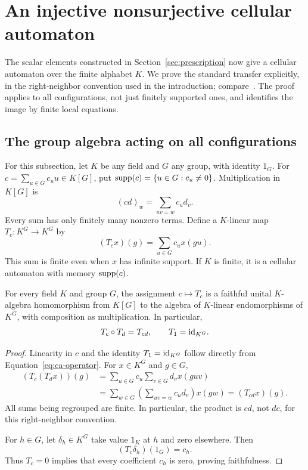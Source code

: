 \section{An injective nonsurjective cellular automaton}
\label{sec:cellular}

The scalar elements constructed in Section~\ref{sec:prescription} now
give a cellular automaton over the finite alphabet $K$. We prove the
standard transfer explicitly, in the right-neighbor convention used
in the introduction; compare\ \cite[Section~1]{ElekSzabo2004}.
The proof applies to all configurations, not just finitely supported
ones, and identifies the image by finite local equations.

\subsection{The group algebra acting on all configurations}

For this subsection, let $K$ be any field and $G$ any group, with
identity $1_G$. For $c=\sum_{u\in G}c_u u\in K[G]$, put
$\operatorname{supp}(c)=\{u\in G:c_u\ne0\}$. Multiplication in $K[G]$ is
\[
  (cd)_w=\sum_{uv=w}c_ud_v.
\]
Every sum has only finitely many nonzero terms. Define a $K$-linear map
$T_c:K^G\to K^G$ by
\begin{equation}
\label{eq:ca-operator}
  (T_cx)(g)=\sum_{u\in G}c_u x(gu).
\end{equation}
This sum is finite even when $x$ has infinite support. If $K$ is
finite, it is a cellular automaton with memory $\operatorname{supp}(c)$.

\begin{lemma}
\label{lem:ca-representation}
For every field $K$ and group $G$, the assignment $c\mapsto T_c$ is
a faithful unital $K$-algebra homomorphism from $K[G]$ to the algebra
of $K$-linear endomorphisms of $K^G$, with composition as multiplication.
In particular,
\begin{equation}
\label{eq:ca-composition}
  T_c\circ T_d=T_{cd},\qquad T_1=\mathrm{id}_{K^G}.
\end{equation}
\end{lemma}

\begin{proof}
Linearity in $c$ and the identity $T_1=\mathrm{id}_{K^G}$ follow directly
from Equation~\eqref{eq:ca-operator}. For $x\in K^G$ and $g\in G$,
\begin{align*}
 (T_c(T_dx))(g)
 &=\sum_{u\in G}c_u\sum_{v\in G}d_vx(guv)\\
 &=\sum_{w\in G}\left(\sum_{uv=w}c_ud_v\right)x(gw)
 =(T_{cd}x)(g).
\end{align*}
All sums being regrouped are finite. In particular, the product is
$cd$, not $dc$, for this right-neighbor convention.

For $h\in G$, let $\delta_h\in K^G$ take value $1_K$ at $h$ and
zero elsewhere. Then
\begin{equation}
\label{eq:ca-coefficient}
  (T_c\delta_h)(1_G)=c_h.
\end{equation}
Thus $T_c=0$ implies that every coefficient $c_h$ is zero, proving
faithfulness.
\end{proof}

